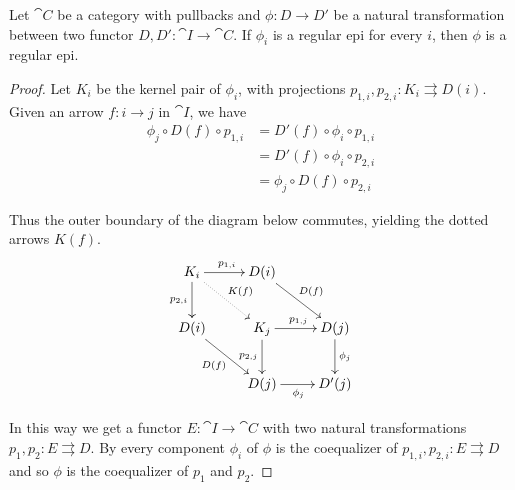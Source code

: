 \begin{cor}\label{cor:regepi1}
Let $\cat{C}$ be a category with pullbacks and $\phi\colon D\to D'$ be a natural transformation between two functor $D, D'\colon \cat{I}\to \cat{C}$. If $\phi_i$ is a regular epi for every $i$, then $\phi$ is a regular epi.
\end{cor}
\begin{proof}
	Let $K_i$ be the kernel pair of $\phi_i$, with projections $p_{1,i}, p_{2,i}\colon K_i\rightrightarrows D(i)$. Given an arrow $f\colon i\to j$ in $\cat{I}$, we have 
	\begin{align*}
		\phi_j\circ D(f)\circ p_{1,i}&=D'(f)\circ \phi_i\circ p_{1,i}\\&=D'(f)\circ \phi_i\circ p_{2,i}\\&=\phi_j\circ D(f)\circ p_{2,i}
	\end{align*}
	
	
	Thus the outer boundary of the diagram below commutes, yielding the dotted arrows $K(f)$.
	\[\xymatrix{K_i \ar@{.>}[dr]^{K(f)}\ar[r]^{p_{1,i}} \ar[d]_{p_{2,i}}& D(i) \ar[dr]^{D(f)}\\D(i) \ar[dr]_{D(f)}&K_j \ar[r]^{p_{1,j}} \ar[d]_{p_{2,j}} & D(j) \ar[d]^{\phi_j}\\ &D(j) \ar[r]_{\phi_j} & D'(j)}\]
	
	In this way we get a functor $E\colon \cat{I}\to \cat{C}$ with two natural transformations $p_{1}, p_2\colon E\rightrightarrows D$. By  every component  $\phi_i$ of $\phi$ is the coequalizer of $p_{1,i}, p_{2,i}\colon E\rightrightarrows D$ and so $\phi$ is the coequalizer of $p_1$ and $p_2$.
\end{proof}



